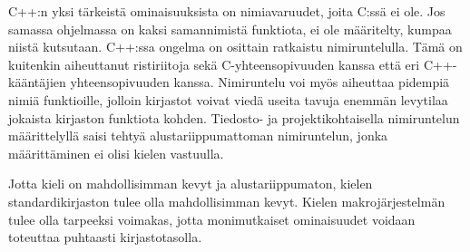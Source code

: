 
C++:n yksi tärkeistä ominaisuuksista on nimiavaruudet, joita C:ssä ei ole. Jos
samassa ohjelmassa on kaksi samannimistä funktiota, ei ole määritelty, kumpaa
niistä kutsutaan. C++:ssa ongelma on osittain ratkaistu nimiruntelulla. Tämä on
kuitenkin aiheuttanut ristiriitoja sekä C-yhteensopivuuden kanssa että eri
C++-kääntäjien yhteensopivuuden kanssa. Nimiruntelu voi myös aiheuttaa pidempiä
nimiä funktioille, jolloin kirjastot voivat viedä useita tavuja enemmän
levytilaa jokaista kirjaston funktiota kohden. Tiedosto- ja projektikohtaisella
nimiruntelun määrittelyllä saisi tehtyä alustariippumattoman nimiruntelun,
jonka määrittäminen ei olisi kielen vastuulla.

Jotta kieli on mahdollisimman kevyt ja alustariippumaton, kielen
standardikirjaston tulee olla mahdollisimman kevyt. Kielen makrojärjestelmän
tulee olla tarpeeksi voimakas, jotta monimutkaiset ominaisuudet voidaan
toteuttaa puhtaasti kirjastotasolla.

%
%
%

